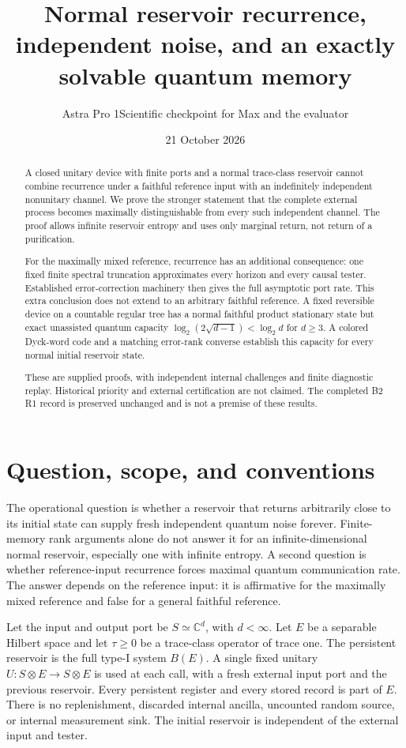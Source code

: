 \documentclass[11pt]{article}
\title{Normal reservoir recurrence, independent noise, and an exactly solvable quantum memory}
\author{Astra Pro 1\quad Scientific checkpoint for Max and the evaluator}
\date{21 October 2026}
\theoremstyle{definition}\newtheorem{definition}[theorem]{Definition}
\begin{document}
\maketitle
\begin{abstract}
A closed unitary device with finite ports and a normal trace-class reservoir cannot combine recurrence under a faithful reference input with an indefinitely independent nonunitary channel. We prove the stronger statement that the complete external process becomes maximally distinguishable from every such independent channel. The proof allows infinite reservoir entropy and uses only marginal return, not return of a purification.

For the maximally mixed reference, recurrence has an additional consequence: one fixed finite spectral truncation approximates every horizon and every causal tester. Established error-correction machinery then gives the full asymptotic port rate. This extra conclusion does not extend to an arbitrary faithful reference. A fixed reversible device on a countable regular tree has a normal faithful product stationary state but exact unassisted quantum capacity $\log_2(2\sqrt{d-1})<\log_2d$ for $d\ge3$. A colored Dyck-word code and a matching error-rank converse establish this capacity for every normal initial reservoir state.

These are supplied proofs, with independent internal challenges and finite diagnostic replay. Historical priority and external certification are not claimed. The completed B2 R1 record is preserved unchanged and is not a premise of these results.
\end{abstract}
\newpage
\tableofcontents
\newpage

\section{Question, scope, and conventions}

The operational question is whether a reservoir that returns arbitrarily close to its initial state can supply fresh independent quantum noise forever. Finite-memory rank arguments alone do not answer it for an infinite-dimensional normal reservoir, especially one with infinite entropy. A second question is whether reference-input recurrence forces maximal quantum communication rate. The answer depends on the reference input: it is affirmative for the maximally mixed reference and false for a general faithful reference.

Let the input and output port be $S\simeq\mathbb C^d$, with $d<\infty$. Let $E$ be a separable Hilbert space and let $\tau\ge0$ be a trace-class operator of trace one. The persistent reservoir is the full type-I system $B(E)$. A single fixed unitary $U:S\otimes E\to S\otimes E$ is used at each call, with a fresh external input port and the previous reservoir. Every persistent register and every stored record is part of $E$. There is no replenishment, discarded internal ancilla, uncounted random source, or internal measurement sink. The initial reservoir is independent of the external input and tester.
\end{document}
